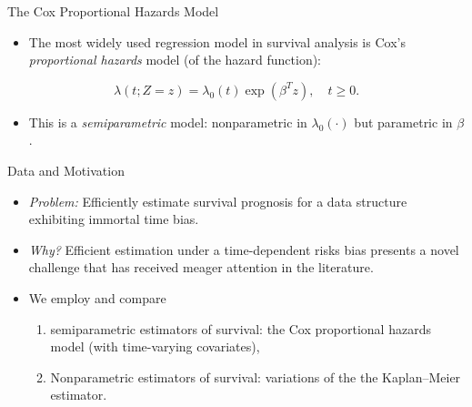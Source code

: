 \documentclass[12pt,t]{beamer}
\begin{document}
\begin{frame}[c]{The Cox Proportional Hazards Model}

\begin{center}
\begin{itemize}
  \item The most widely used regression model in survival analysis is Cox's
    \textit{proportional hazards} model (of the hazard function):
\end{itemize}

$$
\lambda \left(t; Z = z \right) = \lambda_0(t) \exp\left(\beta^Tz \right),
\quad t\geq 0.
$$

\begin{itemize}
  \item This is a \textit{semiparametric} model: nonparametric in
    $\lambda_0(\cdot)$ but parametric in $\beta$.
\end{itemize}
\end{center}


\end{frame}


\begin{frame}[c]{Data and Motivation}

\begin{center}
\begin{itemize}
  \itemsep12pt
  \item \textit{Problem:} Efficiently estimate survival prognosis for a data
    structure exhibiting immortal time bias.
  \item \textit{Why?} Efficient estimation under a time-dependent risks bias
    presents a novel challenge that has received meager attention in the
    literature.
  \item We employ and compare
    \begin{enumerate}
      \item semiparametric estimators of survival: the Cox proportional hazards
        model (with time-varying covariates),
      \item Nonparametric estimators of survival: variations of the the
        Kaplan--Meier estimator.
    \end{enumerate}
\end{itemize}
\end{center}


\end{frame}
\end{document}
